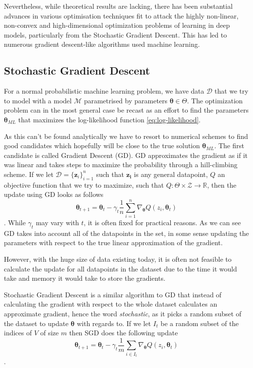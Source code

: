 Nevertheless, while theoretical results are lacking, there has been substantial
advances in various optimisation techniques fit to attack the highly non-linear,
non-convex and high-dimensional optimization problems of learning in deep
models, particularly from the Stochastic Gradient Descent. This has led to
numerous gradient descent-like algorithms used machine learning\cite{Ruder17}.

\subsection{Stochastic Gradient Descent}

For a normal probabilistic machine learning problem, we have data $\mathcal{D}$
that we try to model with a model $\mathcal{M}$ parametrised by parameters
$\bm{\theta} \in \Theta$. The optimization problem can in the most general case be recast
as an effort to find the parameters $\bm{\theta}_{ML}$ that maximizes the
log-likelihood function \eqref{eq:log-likelihood}.

As this can't be found analytically we have to resort to numerical schemes to
find good candidates which hopefully will be close to the true solution
$\bm{\theta}_{ML}$. The first candidate is called Gradient Descent (GD).
GD approximates the gradient as if it was linear and takes steps to maximize the
probability through a hill-climbing scheme. If we let $\mathcal{D} =
\{\bm{z}_i\}_{i = 1}^n$ such that $\bm{z_i}$ is any general datapoint, $Q$ an
objective function that we try to maximize, such that $Q : \Theta \times
\mathcal{Z} \to \mathbb{R}$, then the update using GD looks as follows
\begin{equation}
  \label{eq:GD_update}
  \bm{\theta}_{t + 1} = \bm{\theta}_t - \gamma_t \frac{1}{n} \sum_{i = 1}^n \nabla_{\bm{\theta}} Q(z_i, \bm{\theta}_t)
\end{equation}.
While $\gamma_t$ may vary with $t$, it is often fixed for practical reasons. As
we can see GD takes into account all of the datapoints in the set, in some sense
updating the parameters with respect to the true linear approximation of the gradient.

However, with the huge size of data existing today, it is often not feasible to
calculate the update for all datapoints in the dataset due to the time it would
take and memory it would take to store the gradients.

Stochastic Gradient Descent is a similar algorithm to GD that instead of
calculating the gradient with respect to the whole dataset calculates an
approximate gradient, hence the word \textit{stochastic}, as it picks a random
subset of the dataset to update $\bm{\theta}$ with regards to. If we let $I_t$
be a random subset of the indices of $V$ of size $m$ then SGD does the
following update
\begin{equation}
  \label{eq:SGD_update}
  \bm{\theta}_{t + 1} = \bm{\theta}_t - \gamma_t \frac{1}{m} \sum_{i \in I_t} \nabla_{\bm{\theta}} Q(z_i, \bm{\theta}_t)
\end{equation}\cite{series/lncs/Bottou12}\cite[p.~240]{Bishop:2006}.

